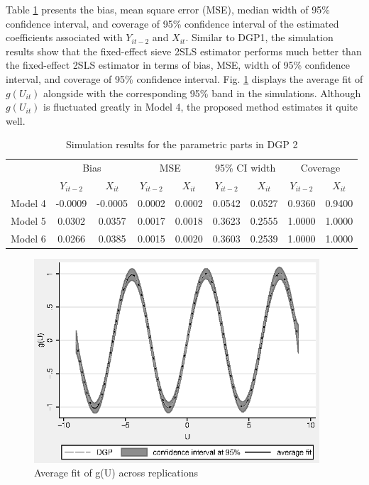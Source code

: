 Table \ref{tab2} presents the bias, mean square error (MSE), median width of 95\% confidence interval, and coverage of 95\% confidence interval of the estimated coefficients associated with $Y_{it-2}$ and $X_{it}$. Similar to DGP1, the simulation results show that the fixed-effect sieve 2SLS estimator performs much better than the fixed-effect 2SLS estimator in terms of bias, MSE, width of 95\% confidence interval, and coverage of 95\% confidence interval. Fig. \ref{fig2} displays the average fit of $g(U_{it})$ alongside with the corresponding 95\% band in the simulations. Although $g(U_{it})$ is fluctuated greatly in Model 4, the proposed method estimates it quite well. 


\begin{table}[htbp]
	
	\scriptsize
	
	\centering
	
	\caption{Simulation results for the parametric parts in DGP 2}
	
	\label{Tab03}
	
	\begin{tabular}{ccccccccc}
		
		\toprule
		
		\multirow{1}{*}{} & \multicolumn{2}{c}{Bias} & \multicolumn{2}{c}{MSE} & \multicolumn{2}{c}{95\% CI width}& \multicolumn{2}{c}{Coverage} \\
		
		\cmidrule(r){2-3} \cmidrule(r){4-5} \cmidrule(r){6-7} \cmidrule(r){8-9}
		
		&  $Y_{it-2}$      &  $X_{it}$   &  $Y_{it-2}$      &  $X_{it}$  & $Y_{it-2}$      &  $X_{it}$ & $Y_{it-2}$      &  $X_{it}$  \\
		
		\midrule
		
		Model 4 &   -0.0009 &   -0.0005 &    0.0002 &    0.0002 &    0.0542 &    0.0527 &    0.9360 &    0.9400 \\ 
		Model 5 &    0.0302 &    0.0357 &    0.0017 &    0.0018 &    0.3623 &    0.2555 &    1.0000 &    1.0000 \\ 
		Model 6 &    0.0266 &    0.0385 &    0.0015 &    0.0020 &    0.3603 &    0.2539 &    1.0000 &    1.0000 \\  
		
		\bottomrule
		
	\end{tabular}
	\label{tab2}	
\end{table}


\begin{figure}[htbp]
	\begin{centering}
		\includegraphics[height=3in]{fig2}
		\caption{Average fit of g(U) across replications}
		\label{fig2}
	\end{centering}
\end{figure}


